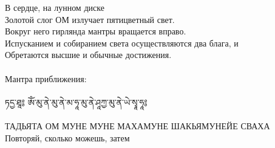 В сердце, на лунном диске\\
Золотой слог ОМ излучает пятицветный свет.\\
Вокруг него гирлянда мантры вращается вправо.\\
Испусканием  и собиранием света осуществляются два блага, и\\
Обретаются высшие и обычные достижения.\\
\\
\scriptsize
Мантра приближения:\\
\normalsize
\ti
\\
ཏདྱ་ཐཱ༔ ཨོཾ་མུ་ནེ་མུ་ནེ་མ་ཧཱ་མུ་ནེ་ཤཱཀྱ་མུ་ནེ་ཡེ་སྭཱ་ཧཱ༔\\
\noindent \ru \\
ТАДЬЯТА ОМ МУНЕ МУНЕ МАХАМУНЕ ШАКЬЯМУНЕЙЕ СВАХА\\
\scriptsize Повторяй, сколько можешь, затем \normalsize

